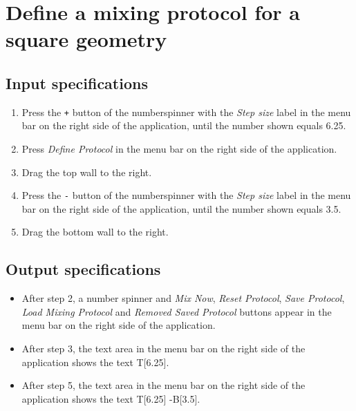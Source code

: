 \section{Define a mixing protocol for a square geometry}

\subsection*{Input specifications}
\begin{enumerate}
\item Press the \texttt{+} button of the numberspinner with the \emph{Step size} label in the menu bar on the right side of the application, until the number shown equals 6.25.
\item Press \emph{Define Protocol} in the menu bar on the right side of the application.
\item Drag the top wall to the right.
\item Press the \texttt{-} button of the numberspinner with the \emph{Step size} label in the menu bar on the right side of the application, until the number shown equals 3.5.
\item Drag the bottom wall to the right.
\end{enumerate}

\subsection*{Output specifications}
\begin{itemize}
\item After step 2, a number spinner and \emph{Mix Now}, \emph{Reset Protocol}, \emph{Save Protocol}, \emph{Load Mixing Protocol} and \emph{Removed Saved Protocol} buttons appear in the menu bar on the right side of the application.
\item After step 3, the text area in the menu bar on the right side of the application shows the text T[6.25].
\item After step 5, the text area in the menu bar on the right side of the application shows the text T[6.25] -B[3.5].
\end{itemize}
